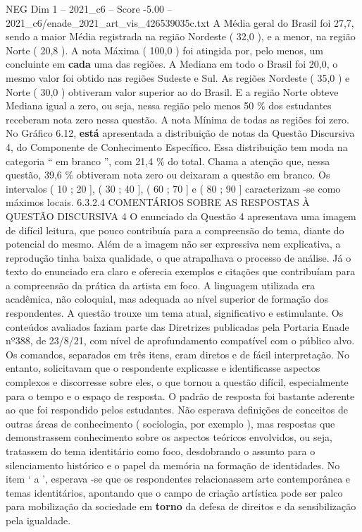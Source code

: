 \begin{textsample}{NEG Dim 1 – 2021\_c6 – Score -5.00 – 2021\_c6/enade\_2021\_art\_vis\_426539035c.txt}
A Média geral do Brasil foi 27,7, sendo a maior Média registrada na região Nordeste ( 32,0 ), e a menor, na região Norte ( 20,8 ).
A nota Máxima ( 100,0 ) foi atingida por, pelo menos, um concluinte em \textbf{cada} uma das regiões.
A Mediana em todo o Brasil foi 20,0, o mesmo valor foi obtido nas regiões Sudeste e Sul.
As regiões Nordeste ( 35,0 ) e Norte ( 30,0 ) obtiveram valor superior ao do Brasil.
E a região Norte obteve Mediana igual a zero, ou seja, nessa região pelo menos 50 \% dos estudantes receberam nota zero nessa questão.
A nota Mínima de todas as regiões foi zero.
No Gráfico 6.12, \textbf{está} apresentada a distribuição de notas da Questão Discursiva 4, do Componente de Conhecimento Específico.
Essa distribuição tem moda na categoria “ em branco ”, com 21,4 \% do total.
Chama a atenção que, nessa questão, 39,6 \% obtiveram nota zero ou deixaram a questão em branco.
Os intervalos ( 10 ; 20 ], ( 30 ; 40 ], ( 60 ; 70 ] e ( 80 ; 90 ] caracterizam -se como máximos locais. 6.3.2.4 COMENTÁRIOS SOBRE AS RESPOSTAS À QUESTÃO DISCURSIVA 4 O enunciado da Questão 4 apresentava uma imagem de difícil leitura, que pouco contribuía para a compreensão do tema, diante do potencial do mesmo.
Além de a imagem não ser expressiva nem explicativa, a reprodução tinha baixa qualidade, o que atrapalhava o processo de análise.
Já o texto do enunciado era claro e oferecia exemplos e citações que contribuíam para a compreensão da prática da artista em foco.
A linguagem utilizada era acadêmica, não coloquial, mas adequada ao nível superior de formação dos respondentes.
A questão trouxe um tema atual, significativo e estimulante.
Os conteúdos avaliados faziam parte das Diretrizes publicadas pela Portaria Enade nº388, de 23/8/21, com nível de aprofundamento compatível com o público alvo.
Os comandos, separados em três itens, eram diretos e de fácil interpretação.
No entanto, solicitavam que o respondente explicasse e identificasse aspectos complexos e discorresse sobre eles, o que tornou a questão difícil, especialmente para o tempo e o espaço de resposta.
O padrão de resposta foi bastante aderente ao que foi respondido pelos estudantes.
Não esperava definições de conceitos de outras áreas de conhecimento ( sociologia, por exemplo ), mas respostas que demonstrassem conhecimento sobre os aspectos teóricos envolvidos, ou seja, tratassem do tema identitário como foco, desdobrando o assunto para o silenciamento histórico e o papel da memória na formação de identidades.
No item ‘ a ’, esperava -se que os respondentes relacionassem arte contemporânea e temas identitários, apontando que o campo de criação artística pode ser palco para mobilização da sociedade em \textbf{torno} da defesa de direitos e da sensibilização pela igualdade.

\end{textsample}
